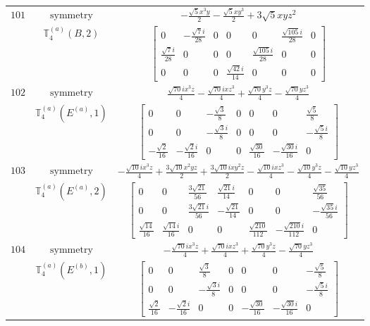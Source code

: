 \documentclass[fleqn,8pt,landscape]{jsarticle}
\begin{document}
\begin{longtable}{ccc}
$ 101 $ & $ \text{symmetry} $ & $ - \frac{\sqrt{5} x^{3} y}{2} - \frac{\sqrt{5} x y^{3}}{2} + 3 \sqrt{5} x y z^{2} $ \\
$  $ & $ \mathbb{T}_{4}^{(a)}(B,2) $ & $ \begin{bmatrix} 0 & - \frac{\sqrt{7} i}{28} & 0 & 0 & 0 & \frac{\sqrt{105} i}{28} & 0 \\ \frac{\sqrt{7} i}{28} & 0 & 0 & 0 & \frac{\sqrt{105} i}{28} & 0 & 0 \\ 0 & 0 & 0 & \frac{\sqrt{42} i}{14} & 0 & 0 & 0 \end{bmatrix} $ \\ \hline
$ 102 $ & $ \text{symmetry} $ & $ \frac{\sqrt{70} i x^{3} z}{4} - \frac{\sqrt{70} i x z^{3}}{4} + \frac{\sqrt{70} y^{3} z}{4} - \frac{\sqrt{70} y z^{3}}{4} $ \\
$  $ & $ \mathbb{T}_{4}^{(a)}(E^{(a)},1) $ & $ \begin{bmatrix} 0 & 0 & - \frac{\sqrt{3}}{8} & 0 & 0 & 0 & \frac{\sqrt{5}}{8} \\ 0 & 0 & - \frac{\sqrt{3} i}{8} & 0 & 0 & 0 & - \frac{\sqrt{5} i}{8} \\ - \frac{\sqrt{2}}{16} & - \frac{\sqrt{2} i}{16} & 0 & 0 & \frac{\sqrt{30}}{16} & - \frac{\sqrt{30} i}{16} & 0 \end{bmatrix} $ \\ \hline
$ 103 $ & $ \text{symmetry} $ & $ - \frac{\sqrt{10} i x^{3} z}{4} + \frac{3 \sqrt{10} x^{2} y z}{2} + \frac{3 \sqrt{10} i x y^{2} z}{2} - \frac{\sqrt{10} i x z^{3}}{4} - \frac{\sqrt{10} y^{3} z}{4} - \frac{\sqrt{10} y z^{3}}{4} $ \\
$  $ & $ \mathbb{T}_{4}^{(a)}(E^{(a)},2) $ & $ \begin{bmatrix} 0 & 0 & \frac{3 \sqrt{21}}{56} & \frac{\sqrt{21} i}{14} & 0 & 0 & \frac{\sqrt{35}}{56} \\ 0 & 0 & \frac{3 \sqrt{21} i}{56} & - \frac{\sqrt{21}}{14} & 0 & 0 & - \frac{\sqrt{35} i}{56} \\ \frac{\sqrt{14}}{16} & \frac{\sqrt{14} i}{16} & 0 & 0 & \frac{\sqrt{210}}{112} & - \frac{\sqrt{210} i}{112} & 0 \end{bmatrix} $ \\ \hline
$ 104 $ & $ \text{symmetry} $ & $ - \frac{\sqrt{70} i x^{3} z}{4} + \frac{\sqrt{70} i x z^{3}}{4} + \frac{\sqrt{70} y^{3} z}{4} - \frac{\sqrt{70} y z^{3}}{4} $ \\
$  $ & $ \mathbb{T}_{4}^{(a)}(E^{(b)},1) $ & $ \begin{bmatrix} 0 & 0 & \frac{\sqrt{3}}{8} & 0 & 0 & 0 & - \frac{\sqrt{5}}{8} \\ 0 & 0 & - \frac{\sqrt{3} i}{8} & 0 & 0 & 0 & - \frac{\sqrt{5} i}{8} \\ \frac{\sqrt{2}}{16} & - \frac{\sqrt{2} i}{16} & 0 & 0 & - \frac{\sqrt{30}}{16} & - \frac{\sqrt{30} i}{16} & 0 \end{bmatrix} $ \\ \hline

\end{longtable}
\end{document}
